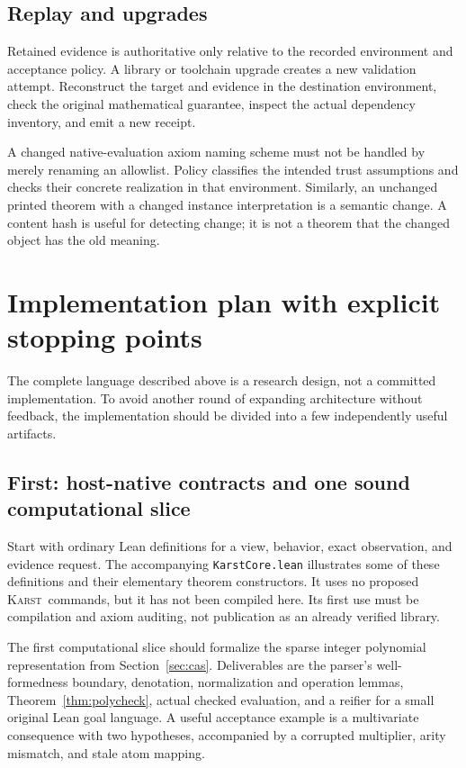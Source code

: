\documentclass[11pt,letterpaper]{article}
\newcommand{\code}[1]{\nolinkurl{#1}}
\newcommand{\Karst}{\textsc{Karst}}
\theoremstyle{remark}
\begin{document}
\subsection{Replay and upgrades}
Retained evidence is authoritative only relative to the recorded environment
and acceptance policy. A library or toolchain upgrade creates a new validation
attempt. Reconstruct the target and evidence in the destination environment,
check the original mathematical guarantee, inspect the actual dependency
inventory, and emit a new receipt.

A changed native-evaluation axiom naming scheme must not be handled by merely
renaming an allowlist. Policy classifies the intended trust assumptions and
checks their concrete realization in that environment. Similarly, an unchanged
printed theorem with a changed instance interpretation is a semantic change.
A content hash is useful for detecting change; it is not a theorem that the
changed object has the old meaning.

\section{Implementation plan with explicit stopping points}\label{sec:implementation}

The complete language described above is a research design, not a committed
implementation. To avoid another round of expanding architecture without
feedback, the implementation should be divided into a few independently useful
artifacts.

\subsection{First: host-native contracts and one sound computational slice}
Start with ordinary Lean definitions for a view, behavior, exact observation,
and evidence request. The accompanying \code{KarstCore.lean} illustrates some
of these definitions and their elementary theorem constructors. It uses no
proposed \Karst\ commands, but it has not been compiled here. Its first use
must be compilation and axiom auditing, not publication as an already verified
library.

The first computational slice should formalize the sparse integer polynomial
representation from Section~\ref{sec:cas}. Deliverables are the parser's
well-formedness boundary, denotation, normalization and operation lemmas,
Theorem~\ref{thm:polycheck}, actual checked evaluation, and a reifier for a
small original Lean goal language. A useful acceptance example is a
multivariate consequence with two hypotheses, accompanied by a corrupted
multiplier, arity mismatch, and stale atom mapping.
\end{document}
